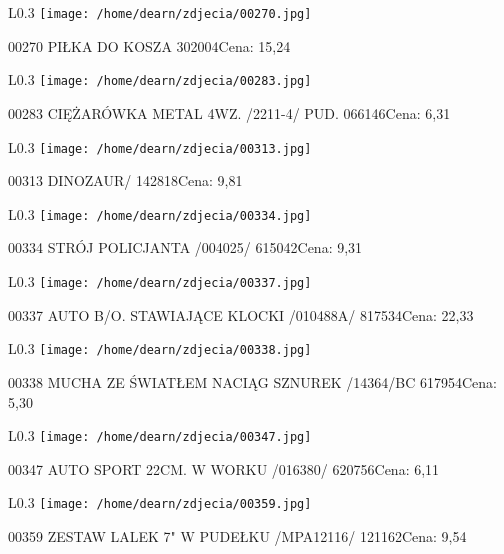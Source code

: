 \begin{wrapfigure}{L}{0.3\textwidth}
\texttt{[image: /home/dearn/zdjecia/00270.jpg]}
\end{wrapfigure}
00270 PIŁKA DO KOSZA 302004Cena: 15,24\newline
\begin{wrapfigure}{L}{0.3\textwidth}
\texttt{[image: /home/dearn/zdjecia/00283.jpg]}
\end{wrapfigure}
00283 CIĘŻARÓWKA METAL 4WZ. /2211-4/  PUD.            066146Cena: 6,31\newline
\begin{wrapfigure}{L}{0.3\textwidth}
\texttt{[image: /home/dearn/zdjecia/00313.jpg]}
\end{wrapfigure}
00313 DINOZAUR/                                       142818Cena: 9,81\newline
\begin{wrapfigure}{L}{0.3\textwidth}
\texttt{[image: /home/dearn/zdjecia/00334.jpg]}
\end{wrapfigure}
00334 STRÓJ POLICJANTA  /004025/                      615042Cena: 9,31\newline
\begin{wrapfigure}{L}{0.3\textwidth}
\texttt{[image: /home/dearn/zdjecia/00337.jpg]}
\end{wrapfigure}
00337 AUTO B/O. STAWIAJĄCE KLOCKI /010488A/           817534Cena: 22,33\newline
\begin{wrapfigure}{L}{0.3\textwidth}
\texttt{[image: /home/dearn/zdjecia/00338.jpg]}
\end{wrapfigure}
00338 MUCHA ZE ŚWIATŁEM NACIĄG SZNUREK /14364/BC      617954Cena: 5,30\newline
\begin{wrapfigure}{L}{0.3\textwidth}
\texttt{[image: /home/dearn/zdjecia/00347.jpg]}
\end{wrapfigure}
00347 AUTO SPORT 22CM. W WORKU /016380/               620756Cena: 6,11\newline
\begin{wrapfigure}{L}{0.3\textwidth}
\texttt{[image: /home/dearn/zdjecia/00359.jpg]}
\end{wrapfigure}
00359 ZESTAW LALEK 7" W PUDEŁKU /MPA12116/            121162Cena: 9,54\newline
